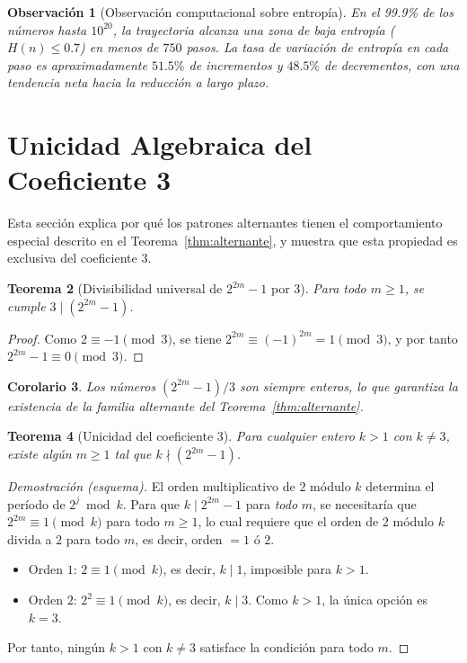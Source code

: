 \documentclass[11pt,a4paper]{article}
\newtheorem{theorem}{Teorema}[section]
\newtheorem{corollary}[theorem]{Corolario}
\newtheorem{remark}[theorem]{Observación}
\begin{document}
\begin{remark}[Observación computacional sobre entropía]
En el 99.9\% de los números hasta $10^{20}$, la trayectoria alcanza
una zona de baja entropía ($H(n) \le 0.7$) en menos de $750$ pasos.
La tasa de variación de entropía en cada paso es aproximadamente
$51.5\%$ de incrementos y $48.5\%$ de decrementos,
con una tendencia neta hacia la reducción a largo plazo.
\end{remark}

\section{Unicidad Algebraica del Coeficiente 3}
\label{sec:unicidad}

Esta sección explica por qué los patrones alternantes tienen el
comportamiento especial descrito en el Teorema~\ref{thm:alternante},
y muestra que esta propiedad es exclusiva del coeficiente $3$.

\begin{theorem}[Divisibilidad universal de $2^{2m}-1$ por $3$]
\label{thm:divisibilidad}
Para todo $m \ge 1$, se cumple $3 \mid (2^{2m}-1)$.
\end{theorem}

\begin{proof}
Como $2 \equiv -1 \pmod{3}$, se tiene
$2^{2m} \equiv (-1)^{2m} = 1 \pmod{3}$,
y por tanto $2^{2m} - 1 \equiv 0 \pmod{3}$.
\end{proof}

\begin{corollary}
Los números $(2^{2m}-1)/3$ son siempre enteros, lo que garantiza
la existencia de la familia alternante del Teorema~\ref{thm:alternante}.
\end{corollary}

\begin{theorem}[Unicidad del coeficiente 3]
\label{thm:unicidad}
Para cualquier entero $k > 1$ con $k \ne 3$, existe algún $m \ge 1$
tal que $k \nmid (2^{2m}-1)$.
\end{theorem}

\begin{proof}[Demostración (esquema)]
El orden multiplicativo de $2$ módulo $k$ determina el período de
$2^j \bmod k$. Para que $k \mid 2^{2m}-1$ para \emph{todo} $m$,
se necesitaría que $2^{2m} \equiv 1 \pmod{k}$ para todo $m\ge1$,
lo cual requiere que el orden de $2$ módulo $k$ divida a $2$ para
todo $m$, es decir, orden $= 1$ ó $2$.
\begin{itemize}[noitemsep]
  \item Orden $1$: $2 \equiv 1 \pmod{k}$, es decir, $k \mid 1$, imposible para $k>1$.
  \item Orden $2$: $2^2 \equiv 1 \pmod{k}$, es decir, $k \mid 3$.
        Como $k>1$, la única opción es $k=3$.
\end{itemize}
Por tanto, ningún $k>1$ con $k\ne3$ satisface la condición para todo $m$.
\end{proof}
\end{document}
